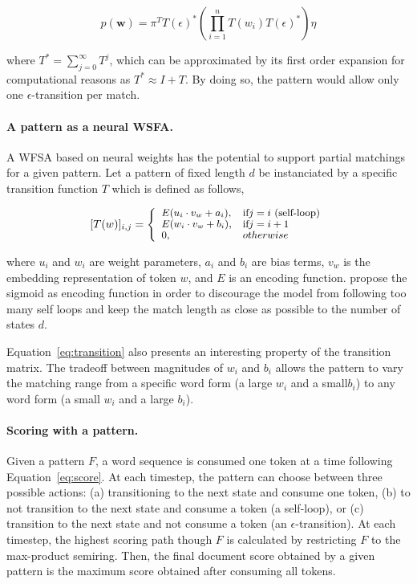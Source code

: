 \documentclass[11pt,a4paper]{article}
\begin{document}
\begin{equation}
p(\mathbf{w}) = \pi^T T(\epsilon)^{\ast}  \left( \prod_{i=1}^{n} T(w_i) T(\epsilon)^\ast  \right) \eta
\label{eq:score}
\end{equation}

where $T^* = \sum_{j=0}^\infty T^j$, which can be approximated by its first order expansion for computational reasons as $T^* \approx I + T$. 
By doing so, the pattern would allow only one $\epsilon$-transition per match.

\paragraph{A pattern as a neural WSFA.}
A WFSA based on neural weights has the potential to support partial matchings for a given pattern.
Let a pattern of fixed length $d$ be instanciated by a specific transition function $T$ which is defined as follows,

\begin{equation}
\small
[T(w)]_{i,j} = 
\left \{
	\begin{array}{ll}
		E(u_i \cdot v_w + a_i), & \mbox{if} j=i \mbox{ (self-loop)} \\
		E(w_i \cdot v_w + b_i), & \mbox{if} j=i+1 \\
		0, & otherwise
	\end{array}
\right .
\label{eq:transition}
\end{equation}

where $u_i$ and $w_i$ are weight parameters, $a_i$ and $b_i$ are bias terms, $v_w$ is the embedding representation of token $w$, and $E$ is an encoding function. \citet{schwartz2018sopa} propose the sigmoid as encoding function in order to discourage the model from following too many self loops and keep the match length as close as possible to the number of states $d$.

Equation~\ref{eq:transition} also presents an interesting property of the transition matrix. The tradeoff between magnitudes of $w_i$ and $b_i$ allows the pattern to vary the matching range from a specific word form (a large  $w_i$ and a small$b_i$) to any word form (a small  $w_i$ and a large $b_i$).

\paragraph{Scoring with a pattern.}
Given a pattern $F$, a word sequence is consumed one token at a time following Equation~\ref{eq:score}.
At each timestep, the pattern can choose between three possible actions: (a) transitioning to the next state and consume one token, (b) to not transition to the next state and consume a token (a self-loop), or (c) transition to the next state and not consume a token (an $\epsilon$-transition). 
At each timestep, the highest scoring path though $F$ is calculated by restricting $F$ to the max-product semiring. 
Then, the final document score obtained by a given pattern is the maximum score obtained after consuming all tokens.
\end{document}
